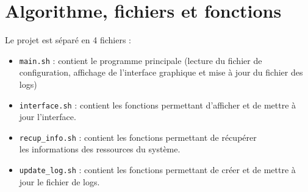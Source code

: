 \documentclass{article}
\begin{document}
\section{Algorithme, fichiers et fonctions}
Le projet est séparé en 4 fichiers :
\begin{itemize}
    \item \texttt{main.sh} : contient le programme principale (lecture du fichier de configuration, affichage de l'interface graphique et mise à jour du fichier des logs)
    \item \texttt{interface.sh} : contient les fonctions permettant d'afficher et de mettre à jour l'interface.
    \item \texttt{recup\_info.sh} : contient les fonctions permettant de récupérer\\ les informations des ressources du système.
    \item \texttt{update\_log.sh} : contient les fonctions permettant de créer et de mettre à jour le fichier de logs. 
\end{itemize}
\vspace{1em}
\end{document}
